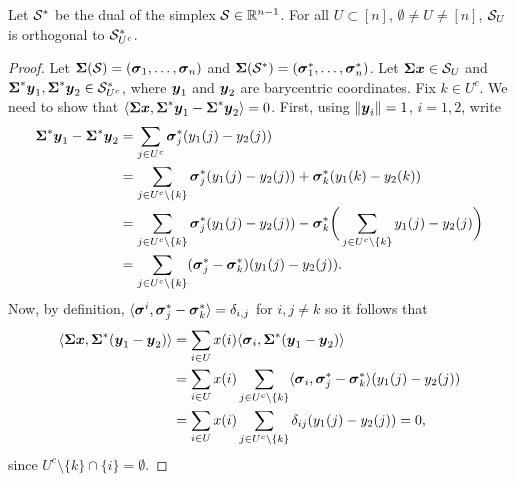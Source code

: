 \begin{lemma}
	\label{lem:dual_faces_orthogonal}
	Let $\mathcal{S}^*$ be the dual of the simplex $\mathcal{S}\in\mathbb{R}^{n-1}$. For all $U\subset[n]$, $\emptyset\neq U\neq[n]$, $\mathcal{S}_U$ is orthogonal to $\mathcal{S}_{U^c}^*$.  
\end{lemma}
\begin{proof}
Let $\boldsymbol{\Sigma}(\mathcal{S})=(\vb*{\sigma}_1,\dots,\vb*{\sigma}_n)$ and $\boldsymbol{\Sigma}(\mathcal{S}^*)=(\vb*{\sigma}^*_1,\dots,\vb*{\sigma}^*_n)$.  Let $\boldsymbol{\Sigma}\vb*{x}\in \mathcal{S}_U$ and $\boldsymbol{\Sigma}^*\vb*{y}_1,\boldsymbol{\Sigma}^*\vb*{y}_2\in \mathcal{S}^*_{U^c}$, where $\vb*{y}_1$ and $\vb*{y}_2$ are barycentric coordinates. Fix $k\in U^c$. We need to show that $\langle \boldsymbol{\Sigma}\vb*{x},\boldsymbol{\Sigma}^*\vb*{y}_1-\boldsymbol{\Sigma}^*\vb*{y}_2\rangle =0$. First, using $\norm{\vb*{y}_i}=1$, $i=1,2$, write
\begin{align*}
	 \boldsymbol{\Sigma}^*\vb*{y}_1 - \boldsymbol{\Sigma}^*\vb*{y}_2 &= \sum_{j\in U^c} \vb*{\sigma}^*_j(y_1(j)-y_2(j)) \\
	 &=\sum_{j\in U^c\setminus \{k\}} \vb*{\sigma}^*_j(y_1(j)-y_2(j)) + \vb*{\sigma}^*_k(y_1(k)-y_2(k)) \\
    &= \sum_{j\in U^c\setminus\{k\}}\vb*{\sigma}^*_j(y_1(j)-y_2(j))  -\vb*{\sigma}^*_k\bigg(\sum_{j\in U^c\setminus \{k\}} y_1(j)-y_2(j)\bigg) \\
    &= \sum_{j\in U^c\setminus\{k\}} (\vb*{\sigma}^*_j-\vb*{\sigma}^*_k)(y_1(j)-y_2(j)). 
\end{align*}
Now, by definition, $\langle \vb*{\sigma}^i,\vb*{\sigma}^*_j-\vb*{\sigma}^*_k\rangle = \delta_{i,j}$ for $i,j\neq k$ so it follows that 
\begin{align*}
\langle \boldsymbol{\Sigma}\vb*{x},\boldsymbol{\Sigma}^*(\vb*{y}_1-\vb*{y}_2)\rangle &= \sum_{i\in U} x(i)\langle \vb*{\sigma}_i,\boldsymbol{\Sigma}^*(\vb*{y}_1-\vb*{y}_2)\rangle \\
&= \sum_{i\in U}x(i)\sum_{j\in U^c\setminus \{k\}} \langle \vb*{\sigma}_i,\vb*{\sigma}^*_j-\vb*{\sigma}^*_k\rangle (y_1(j)-y_2(j)) \\
&=\sum_{i\in U} x(i) \sum_{j\in U^c\setminus\{k\}} \delta_{ij}(y_1(j)-y_2(j)) = 0, 
\end{align*}
since $U^c\setminus\{k\}\cap\{i\}=\emptyset$. 
\end{proof}

